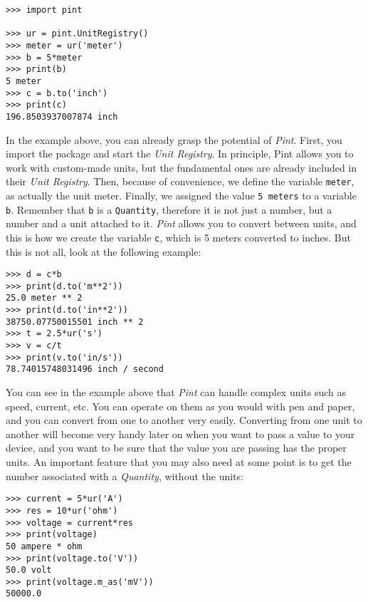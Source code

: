 \begin{verbatim}
>>> import pint

>>> ur = pint.UnitRegistry()
>>> meter = ur('meter')
>>> b = 5*meter
>>> print(b)
5 meter
>>> c = b.to('inch')
>>> print(c)
196.8503937007874 inch
\end{verbatim}

In the example above, you can already grasp the potential of
\emph{Pint}. First, you import the package and start the \emph{Unit
Registry}. In principle, Pint allows you to work with custom-made units,
but the fundamental ones are already included in their \emph{Unit
Registry}. Then, because of convenience, we define the variable
\texttt{meter}, as actually the unit meter. Finally, we assigned the
value \texttt{5\ meters} to a variable \texttt{b}. Remember that
\texttt{b} is a \texttt{Quantity}, therefore it is not just a number,
but a number and a unit attached to it. \emph{Pint} allows you to
convert between units, and this is how we create the variable
\texttt{c}, which is 5 meters converted to inches. But this is not all,
look at the following example:

\begin{verbatim}
>>> d = c*b
>>> print(d.to('m**2'))
25.0 meter ** 2
>>> print(d.to('in**2'))
38750.07750015501 inch ** 2
>>> t = 2.5*ur('s')
>>> v = c/t
>>> print(v.to('in/s'))
78.74015748031496 inch / second
\end{verbatim}

You can see in the example above that \emph{Pint} can handle complex
units such as speed, current, etc. You can operate on them as you would
with pen and paper, and you can convert from one to another very easily.
Converting from one unit to another will become very handy later on when
you want to pass a value to your device, and you want to be sure that
the value you are passing has the proper units. An important feature
that you may also need at some point is to get the number associated
with a \emph{Quantity}, without the units:

\begin{verbatim}
>>> current = 5*ur('A')
>>> res = 10*ur('ohm')
>>> voltage = current*res
>>> print(voltage)
50 ampere * ohm
>>> print(voltage.to('V'))
50.0 volt
>>> print(voltage.m_as('mV'))
50000.0
\end{verbatim}


